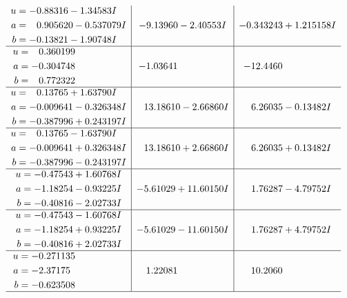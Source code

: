 \documentclass[1p]{elsarticle_modified}
\theoremstyle{definition}
\begin{document}
$$\begin{array}{c|c|c}
\begin{aligned}
u &= -0.88316 - 1.34583 I \\
a &= \phantom{-}0.905620 - 0.537079 I \\
b &= -0.13821 - 1.90748 I\end{aligned}
 & -9.13960 - 2.40553 I & -0.343243 + 1.215158 I \\ \hline\begin{aligned}
u &= \phantom{-}0.360199\phantom{ +0.000000I} \\
a &= -0.304748\phantom{ +0.000000I} \\
b &= \phantom{-}0.772322\phantom{ +0.000000I}\end{aligned}
 & -1.03641\phantom{ +0.000000I} & -12.4460\phantom{ +0.000000I} \\ \hline\begin{aligned}
u &= \phantom{-}0.13765 + 1.63790 I \\
a &= -0.009641 - 0.326348 I \\
b &= -0.387996 + 0.243197 I\end{aligned}
 & \phantom{-}13.18610 - 2.66860 I & \phantom{-}6.26035 - 0.13482 I \\ \hline\begin{aligned}
u &= \phantom{-}0.13765 - 1.63790 I \\
a &= -0.009641 + 0.326348 I \\
b &= -0.387996 - 0.243197 I\end{aligned}
 & \phantom{-}13.18610 + 2.66860 I & \phantom{-}6.26035 + 0.13482 I \\ \hline\begin{aligned}
u &= -0.47543 + 1.60768 I \\
a &= -1.18254 - 0.93225 I \\
b &= -0.40816 - 2.02733 I\end{aligned}
 & -5.61029 + 11.60150 I & \phantom{-}1.76287 - 4.79752 I \\ \hline\begin{aligned}
u &= -0.47543 - 1.60768 I \\
a &= -1.18254 + 0.93225 I \\
b &= -0.40816 + 2.02733 I\end{aligned}
 & -5.61029 - 11.60150 I & \phantom{-}1.76287 + 4.79752 I \\ \hline\begin{aligned}
u &= -0.271135\phantom{ +0.000000I} \\
a &= -2.37175\phantom{ +0.000000I} \\
b &= -0.623508\phantom{ +0.000000I}\end{aligned}
 & \phantom{-}1.22081\phantom{ +0.000000I} & \phantom{-}10.2060\phantom{ +0.000000I}\\
 \hline 
 \end{array}$$\newpage\newpage\renewcommand{\arraystretch}{1}
\end{document}
